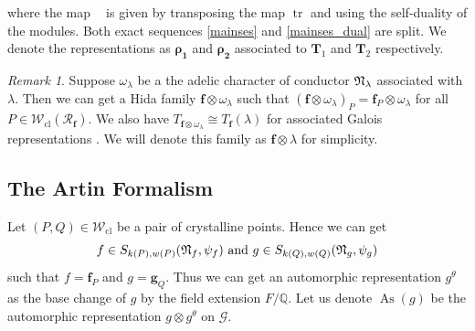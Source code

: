 \documentclass[10pt]{amsart}
\numberwithin{equation}{section}
\theoremstyle{definition}
\theoremstyle{remark} %
\newtheorem{rmk}[thm]{Remark}
\newcommand{\bs}{\boldsymbol}
\newcommand{\mrm}{\mathrm}
\newcommand{\cal}{\mathcal}
\DeclareMathOperator{\tr}{{tr}^*}
\newcommand{\f}{\mathbf{f}}
\newcommand{\g}{\mathbf{g}}
\newcommand{\Q}{\mathbb{Q}}
\newcommand{\R}{\mathcal{R}}
\newcommand{\T}{\mathbf{T}}
\newcommand{\W}{\mathcal{W}}
\begin{document}
	where the map $ \tr $ is given by transposing the map $ \operatorname{tr} $ and using the self-duality of the modules. Both exact sequences \eqref{mainses} and \eqref{mainses_dual} are split. We denote the representations as $ \bs{\rho_1} $ and $ \bs{\rho_2} $ associated to $ \T_1 $ and $ \T_2 $ respectively.
	\begin{rmk}
		\label{Remark:1.15}
		Suppose $ \omega_{\lambda} $ be a the adelic character of conductor $ \frak{N}_\lambda $ associated with $ \lambda $. Then we can get a Hida family $ \f \otimes \omega_{\lambda} $ such that $ (\f \otimes \omega_{\lambda})_P = \f_P \otimes \omega_{\lambda} $ for all $ P \in \W_{\mrm{cl}}(\R_{\f}) $. We also have $ T_{\f \otimes \omega_{\lambda}} \cong T_\f(\lambda) $ for associated Galois representations \cite[\textsection7F]{Hida91}. We will denote this family as $ \f \otimes \lambda $ for simplicity.
	\end{rmk}
	
	\subsection{The Artin Formalism}
	\label{sec_artin_formalism}
	Let $ (P,Q) \in \W_{\mrm{cl}} $ be a pair of crystalline points. Hence we can get 
	\begin{equation*}
		f \in S_{k(P),w(P)}(\frak{N}_f, \psi_f) \text{ and } g \in S_{k(Q),w(Q)}(\frak{N}_g, \psi_g)
	\end{equation*}
	such that $f = \f_P $ and $ g =  \g_Q $. Thus we can get an automorphic representation $ g^\theta $ as the base change of $ g $ by the field extension $ F/\Q $. Let us denote $ \operatorname{As}(g)$ be the automorphic representation  $ g \otimes g^\theta $ on $ \cal G $. 
\end{document}
